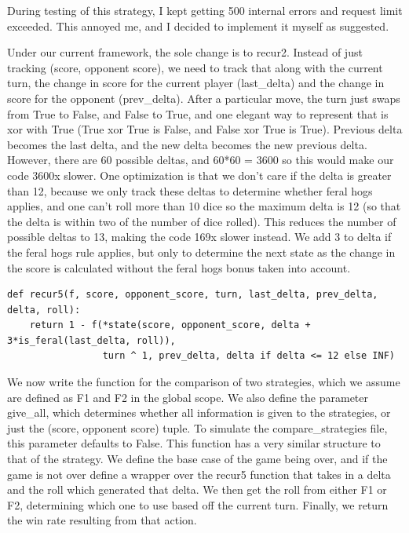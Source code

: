 \documentclass[11pt, oneside]{article}
\begin{document}
During testing of this strategy, I kept getting 500 internal errors
and request limit exceeded. This annoyed me, and I decided to implement it 
myself as suggested.

Under our current framework, the sole change is to recur2.
Instead of just tracking (score, opponent score), we need to track
that along with the current turn, the change in score for the current player
(last\_delta) and the change in score for the opponent (prev\_delta).
After a particular move,
the turn just swaps from True to False, and False to True,
and one elegant way to represent that is xor with True 
(True xor True is False, and False xor True is True).
Previous delta becomes the last delta, 
and the new delta becomes the new previous delta.
However, there are 60 possible deltas, and 60*60 = 3600
so this would make our code 3600x slower.
One optimization is that we don't care if the delta is greater than 12,
because we only track these deltas to determine whether feral hogs applies,
and one can't roll more than 10 dice so the maximum delta is 12
(so that the delta is within two of the number of dice rolled).
This reduces the number of possible deltas to 13,
making the code 169x slower instead.
We add 3 to delta if the feral hogs rule applies,
but only to determine the next state as the change in the score
is calculated without the feral hogs bonus taken into account.

\begin{verbatim}
def recur5(f, score, opponent_score, turn, last_delta, prev_delta, delta, roll):
    return 1 - f(*state(score, opponent_score, delta + 3*is_feral(last_delta, roll)), 
                 turn ^ 1, prev_delta, delta if delta <= 12 else INF)
\end{verbatim} 

We now write the function for the comparison of two strategies, 
which we assume are defined as F1 and F2 in the global scope. 
We also define the parameter give\_all, which determines whether
all information is given to the strategies, 
or just the (score, opponent score) tuple. 
To simulate the compare\_strategies file, this parameter defaults to False.
This function has a very similar structure to that of the strategy.
We define the base case of the game being over, and if the game is not over
define a wrapper over the recur5 function that takes in a delta and the roll
which generated that delta. We then get the roll from either F1 or F2,
determining which one to use based off the current turn.
Finally, we return the win rate resulting from that action.
\end{document}
